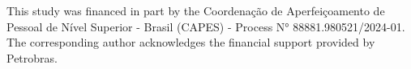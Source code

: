 \documentclass[pdflatex,sn-basic]{sn-jnl}%
\theoremstyle{thmstyleone}%
\theoremstyle{thmstyletwo}%
\theoremstyle{thmstylethree}%
\begin{document}
This study was financed in part by the Coordenação de Aperfeiçoamento de Pessoal de Nível Superior - Brasil (CAPES) - Process N° 88881.980521/2024-01. The corresponding author acknowledges the financial support provided by Petrobras.






\end{document}
